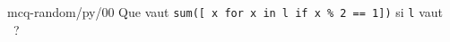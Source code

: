 
\begin{question}{mcq-random/py/00}
  Que vaut {\tt sum([ x for x in l if x \% 2 == 1])} si {\tt l} vaut
  {\tt \WEBAMCVARl}~?
  \begin{reponses}
    \bonne{\WEBAMCVARok}
    \mauvaise{\WEBAMCVARpasoka}
    \mauvaise{\WEBAMCVARpasokb}
    \mauvaise{\WEBAMCVARpasokc}
    \mauvaise{\WEBAMCVARfalse}
    \mauvaise{\WEBAMCVARtrue}
  \end{reponses}
\end{question}
